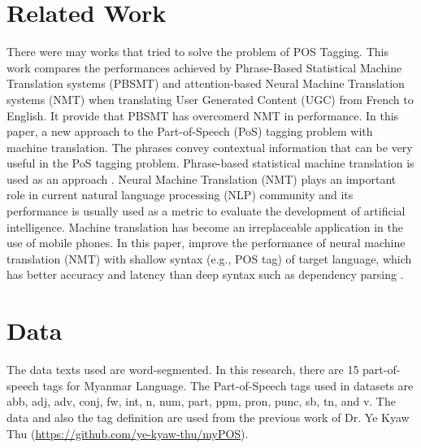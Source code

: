 \documentclass[conference]{IEEEtran}
\begin{document}
\section{Related Work}\label{Sec:RelatedWork}
There were may works that tried to solve the problem of POS Tagging. \cite{b1} This work compares the performances achieved by Phrase-Based Statistical Machine Translation systems (PBSMT) and attention-based Neural Machine Translation systems (NMT) when translating User Generated Content (UGC) from French to English. It provide that PBSMT has overcomerd NMT in performance. In this paper, a new approach to the Part-of-Speech (PoS) tagging problem with machine translation. The phrases convey contextual information that can be very useful in the PoS tagging problem. Phrase-based statistical machine translation is used as an approach \cite{b2}.
Neural Machine Translation (NMT) plays an important role in current natural language processing (NLP) community and its performance is usually used as a metric to evaluate the development of artificial intelligence. Machine translation has become an irreplaceable application in the use of mobile phones.  In this paper, improve the performance of neural machine translation (NMT) with shallow syntax (e.g., POS tag) of target language, which has better accuracy and latency than deep syntax such as dependency parsing \cite{b3}.

\section{Data}
\label{Data}

The data texts used are word-segmented. In this research, there are 15 part-of-speech tags for Myanmar Language. The Part-of-Speech tags used in datasets are abb, adj, adv, conj, fw, int, n, num, part, ppm, pron, punc, sb, tn, and v.
The data and also the tag definition are used from the previous work of Dr. Ye Kyaw Thu (\href{https://github.com/ye-kyaw-thu/myPOS}{https://github.com/ye-kyaw-thu/myPOS}). 
\end{document}
